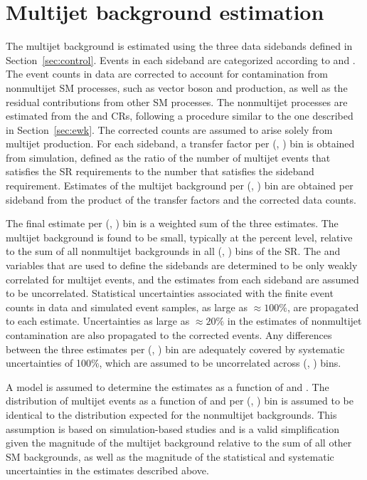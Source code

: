 \section{Multijet background estimation}
\label{sec:qcd}

The multijet background is estimated using the three data sidebands
defined in Section~\ref{sec:control}. Events in each sideband are
categorized according to \njet and \scalht. The event counts in data
are corrected to account for contamination from nonmultijet SM
processes, such as vector boson and \ttbar production, as well as the
residual contributions from other SM processes. The nonmultijet
processes are estimated from the \mj and \mmj CRs, following a
procedure similar to the one described in Section~\ref{sec:ewk}. The
corrected counts are assumed to arise solely from multijet
production. For each sideband, a transfer factor per (\njet, \scalht)
bin is obtained from simulation, defined as the ratio of the number of
multijet events that satisfies the SR requirements to the number that
satisfies the sideband requirement. Estimates of the multijet
background per (\njet, \scalht) bin are obtained per sideband from the
product of the transfer factors and the corrected data counts.

The final estimate per (\njet, \scalht) bin is a weighted sum of the
three estimates. The multijet background is found to be small,
typically at the percent level, relative to the sum of all nonmultijet
backgrounds in all (\njet, \nb) bins of the SR. The \mhtmet and \bdphi
variables that are used to define the sidebands are determined to be
only weakly correlated for multijet events, and the estimates from
each sideband are assumed to be uncorrelated. Statistical
uncertainties associated with the finite event counts in data and
simulated event samples, as large as ${\approx}100\%$, are propagated
to each estimate. Uncertainties as large as ${\approx}20\%$ in the
estimates of nonmultijet contamination are also propagated to the
corrected events. Any differences between the three estimates per
(\njet, \scalht) bin are adequately covered by systematic
uncertainties of 100\%, which are assumed to be uncorrelated across
(\njet, \scalht) bins.

A model is assumed to determine the estimates as a function of \nb and
\mht. The distribution of multijet events as a function of \nb and
\mht per (\njet, \scalht) bin is assumed to be identical to the
distribution expected for the nonmultijet backgrounds. This assumption
is based on simulation-based studies and is a valid simplification
given the magnitude of the multijet background relative to the sum of
all other SM backgrounds, as well as the magnitude of the statistical
and systematic uncertainties in the estimates described above.


